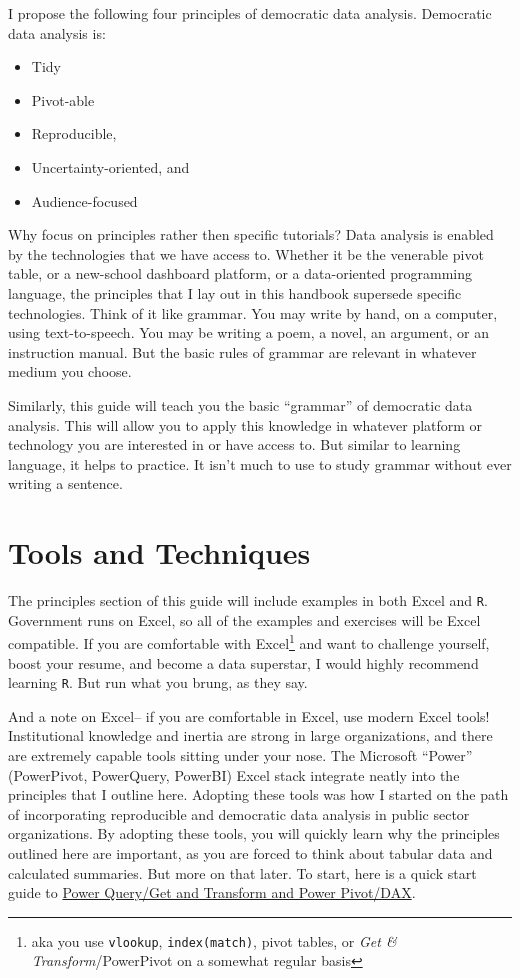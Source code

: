 \documentclass[
]{book}
\providecommand{\tightlist}{%
  \setlength{\itemsep}{0pt}\setlength{\parskip}{0pt}}
\begin{document}
I propose the following four principles of democratic data analysis. Democratic data analysis is:

\begin{itemize}
\tightlist
\item
  Tidy
\item
  Pivot-able
\item
  Reproducible,
\item
  Uncertainty-oriented, and
\item
  Audience-focused
\end{itemize}

Why focus on principles rather then specific tutorials? Data analysis is enabled by the technologies that we have access to. Whether it be the venerable pivot table, or a new-school dashboard platform, or a data-oriented programming language, the principles that I lay out in this handbook supersede specific technologies. Think of it like grammar. You may write by hand, on a computer, using text-to-speech. You may be writing a poem, a novel, an argument, or an instruction manual. But the basic rules of grammar are relevant in whatever medium you choose.

Similarly, this guide will teach you the basic ``grammar'' of democratic data analysis. This will allow you to apply this knowledge in whatever platform or technology you are interested in or have access to. But similar to learning language, it helps to practice. It isn't much to use to study grammar without ever writing a sentence.

\hypertarget{tools-and-techniques}{%
\section{Tools and Techniques}\label{tools-and-techniques}}

The principles section of this guide will include examples in both Excel and \texttt{R}. Government runs on Excel, so all of the examples and exercises will be Excel compatible. If you are comfortable with Excel\footnote{aka you use \texttt{vlookup}, \texttt{index(match)}, pivot tables, or \emph{Get \& Transform}/PowerPivot on a somewhat regular basis} and want to challenge yourself, boost your resume, and become a data superstar, I would highly recommend learning \texttt{R}. But run what you brung, as they say.

And a note on Excel-- if you are comfortable in Excel, use modern Excel tools! Institutional knowledge and inertia are strong in large organizations, and there are extremely capable tools sitting under your nose. The Microsoft ``Power'' (PowerPivot, PowerQuery, PowerBI) Excel stack integrate neatly into the principles that I outline here. Adopting these tools was how I started on the path of incorporating reproducible and democratic data analysis in public sector organizations. By adopting these tools, you will quickly learn why the principles outlined here are important, as you are forced to think about tabular data and calculated summaries. But more on that later. To start, here is a quick start guide to \href{https://support.office.com/en-us/article/get-started-with-power-pivot-in-microsoft-excel-fdfcf944-7876-424a-8437-1a6c1043a80b}{Power Query/Get and Transform and Power Pivot/DAX}.
\end{document}
